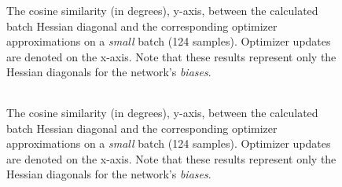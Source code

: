 \begin{figure}[h!]
    \centering
    \begin{tabular}{cc}
         \\ %
    \end{tabular}
    \caption{The cosine similarity (in degrees), y-axis, between the calculated batch Hessian diagonal and the corresponding optimizer approximations on a \emph{small} batch (124 samples).
    Optimizer updates are denoted on the x-axis.
    Note that these results represent only the Hessian diagonals for the network's \emph{biases}.}
    \label{fig:cosine-bias-big-batch}
\end{figure}
\begin{figure}[h!]
    \centering
    \begin{tabular}{cc}
         \\ %
    \end{tabular}
    \caption{The cosine similarity (in degrees), y-axis, between the calculated batch Hessian diagonal and the corresponding optimizer approximations on a \emph{small} batch (124 samples).
    Optimizer updates are denoted on the x-axis.
    Note that these results represent only the Hessian diagonals for the network's \emph{biases}.}
    \label{fig:sappolo-cosine-bias-small-batch}
\end{figure}
